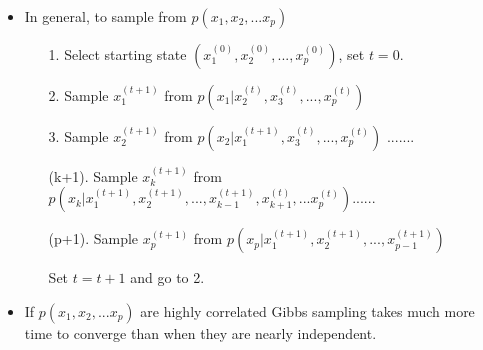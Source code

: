 \documentclass[12pt]{article}
\begin{document}
\begin{itemize}
\item In general, to sample from $p(x_1,x_2, ... x_p)$

\begin{enumerate}
\item[1.] Select starting state $(x_1^{(0)}, x_2^{(0)}, ... , x_p^{(0)})$, set $t=0$.
\item[2.] Sample $x_1^{(t+1)}$ from $p(x_1 | x_2^{(t)}, x_3^{(t)}, ... , x_p^{(t)})$
\item[3.] Sample $x_2^{(t+1)}$ from $p(x_2 | x_1^{(t+1)}, x_3^{(t)}, ... , x_p^{(t)})$ .......
\item[(k+1).] Sample $x_k^{(t+1)}$ from $p(x_k | x_1^{(t+1)}, x_2^{(t+1)}, ... , x_{k-1}^{(t+1)}, x_{k+1}^{(t)}, ... x_p^{(t)})$......
\item[(p+1).] Sample $x_p^{(t+1)}$ from $p(x_p | x_1^{(t+1)}, x_2^{(t+1)}, ... ,x_{p-1}^{(t+1)})$
\item[] Set $t=t+1$ and go to 2.
\end{enumerate}

\item If $p(x_1,x_2, ... x_p)$ are highly correlated Gibbs sampling takes much more time to converge than when they are nearly independent.
\end{itemize}
\end{document}
